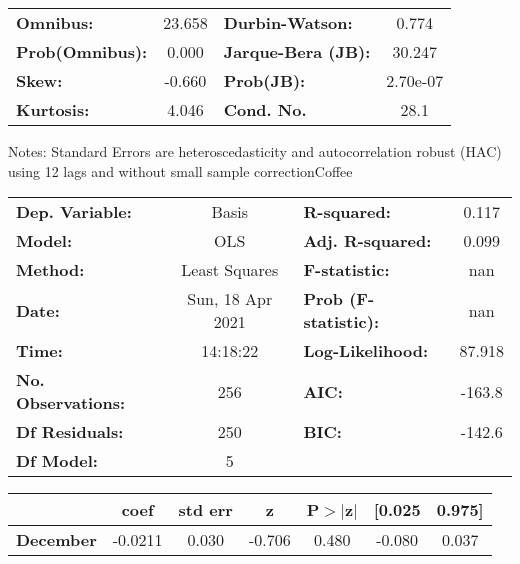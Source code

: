 \begin{center}
\begin{tabular}{lcccccc}
\bottomrule
\end{tabular}
\begin{tabular}{lclc}
\textbf{Omnibus:}       & 23.658 & \textbf{  Durbin-Watson:     } &    0.774  \\
\textbf{Prob(Omnibus):} &  0.000 & \textbf{  Jarque-Bera (JB):  } &   30.247  \\
\textbf{Skew:}          & -0.660 & \textbf{  Prob(JB):          } & 2.70e-07  \\
\textbf{Kurtosis:}      &  4.046 & \textbf{  Cond. No.          } &     28.1  \\
\bottomrule
\end{tabular}
\end{center}

Notes: \newline
 [1] Standard Errors are heteroscedasticity and autocorrelation robust (HAC) using 12 lags and without small sample correctionCoffee\begin{center}
\begin{tabular}{lclc}
\toprule
\textbf{Dep. Variable:}    &      Basis       & \textbf{  R-squared:         } &     0.117   \\
\textbf{Model:}            &       OLS        & \textbf{  Adj. R-squared:    } &     0.099   \\
\textbf{Method:}           &  Least Squares   & \textbf{  F-statistic:       } &       nan   \\
\textbf{Date:}             & Sun, 18 Apr 2021 & \textbf{  Prob (F-statistic):} &      nan    \\
\textbf{Time:}             &     14:18:22     & \textbf{  Log-Likelihood:    } &    87.918   \\
\textbf{No. Observations:} &         256      & \textbf{  AIC:               } &    -163.8   \\
\textbf{Df Residuals:}     &         250      & \textbf{  BIC:               } &    -142.6   \\
\textbf{Df Model:}         &           5      & \textbf{                     } &             \\
\bottomrule
\end{tabular}
\begin{tabular}{lcccccc}
                  & \textbf{coef} & \textbf{std err} & \textbf{z} & \textbf{P$> |$z$|$} & \textbf{[0.025} & \textbf{0.975]}  \\
\midrule
\textbf{December} &      -0.0211  &        0.030     &    -0.706  &         0.480        &       -0.080    &        0.037     \\

\end{tabular}
\end{center}

